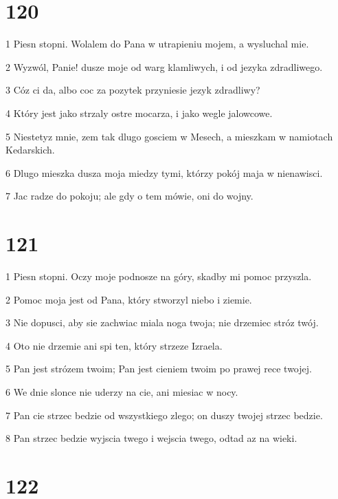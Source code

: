 \chapter{120}

\par 1 Piesn stopni. Wolalem do Pana w utrapieniu mojem, a wysluchal mie.
\par 2 Wyzwól, Panie! dusze moje od warg klamliwych, i od jezyka zdradliwego.
\par 3 Cóz ci da, albo coc za pozytek przyniesie jezyk zdradliwy?
\par 4 Który jest jako strzaly ostre mocarza, i jako wegle jalowcowe.
\par 5 Niestetyz mnie, zem tak dlugo gosciem w Mesech, a mieszkam w namiotach Kedarskich.
\par 6 Dlugo mieszka dusza moja miedzy tymi, którzy pokój maja w nienawisci.
\par 7 Jac radze do pokoju; ale gdy o tem mówie, oni do wojny.

\chapter{121}

\par 1 Piesn stopni. Oczy moje podnosze na góry, skadby mi pomoc przyszla.
\par 2 Pomoc moja jest od Pana, który stworzyl niebo i ziemie.
\par 3 Nie dopusci, aby sie zachwiac miala noga twoja; nie drzemiec stróz twój.
\par 4 Oto nie drzemie ani spi ten, który strzeze Izraela.
\par 5 Pan jest strózem twoim; Pan jest cieniem twoim po prawej rece twojej.
\par 6 We dnie slonce nie uderzy na cie, ani miesiac w nocy.
\par 7 Pan cie strzec bedzie od wszystkiego zlego; on duszy twojej strzec bedzie.
\par 8 Pan strzec bedzie wyjscia twego i wejscia twego, odtad az na wieki.

\chapter{122}

